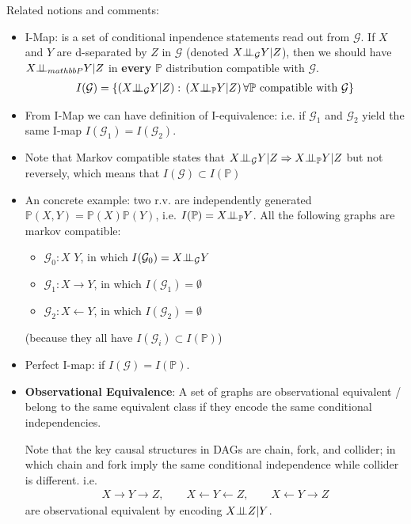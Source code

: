 Related notions and comments:

\begin{itemize}[topsep=2pt,itemsep=0pt]
    \item I-Map: is a set of conditional inpendence statements read out from $ \mathcal{G} $. If $ X $ and $ Y $ are d-separated by $ Z $ in $ \mathcal{G} $ (denoted $ X\bot\!\!\!\bot_\mathcal{G} Y|Z $), then we should have $ X\bot\!\!\!\bot_{mathbb{P}} Y |Z$ in \textbf{every} $ \mathbb{P} $ distribution compatible with $ \mathcal{G} $.
    \begin{align}
         I(\mathcal{G})=\left\{ (X\bot\!\!\!\bot_\mathcal{G}Y|Z):\, (X\bot\!\!\!\bot_\mathbb{P}Y|Z) \,\forall \mathbb{P}\text{ compatible with }\mathcal{G}  \right\}
    \end{align}
    \item From I-Map we can have definition of I-equivalence: i.e. if $ \mathcal{G}_1 $ and $ \mathcal{G}_2 $ yield the same I-map $ I(\mathcal{G}_1)=I(\mathcal{G}_2) $.
    \item Note that Markov compatible states that $ X\bot\!\!\!\bot _\mathcal{G} Y|Z\Rightarrow  X\bot\!\!\!\bot _\mathbb{P} Y|Z $ but not reversely, which means that $ I(\mathcal{G})\subset I(\mathbb{P}) $
    \item An concrete example: two r.v. are independently generated $ \mathbb{P}\left( X,Y \right) =\mathbb{P}\left( X\right)\mathbb{P}\left( Y \right) $, i.e. $ I(\mathbb{P})= X\bot\!\!\!\bot_\mathbb{P} Y $. All the following graphs are markov compatible:
    \begin{itemize}[topsep=2pt,itemsep=0pt]
        \item $ \mathcal{G}_0: X\,\, Y $, in which $ I(\mathcal{G}_0) = X\bot\!\!\!\bot _\mathcal{G} Y $
        \item $ \mathcal{G}_1: X\to Y $, in which $ I(\mathcal{G}_1) = \emptyset  $
        \item $ \mathcal{G}_2: X\leftarrow Y $, in which $  I(\mathcal{G}_2) = \emptyset $
    \end{itemize}
    (because they all have $ I(\mathcal{G}_i)\subset I(\mathbb{P}) $)
    \item Perfect I-map: if $ I(\mathcal{G})=I(\mathbb{P}) $.
    \item \textbf{Observational Equivalence}: A set of graphs are observational equivalent / belong to the same equivalent class if they encode the same conditional independencies. 
    
    Note that the key causal structures in DAGs are chain, fork, and collider; in which chain and fork imply the same conditional independence while collider is different. i.e.
    \begin{align}
        X\to Y\to Z,\qquad X\leftarrow Y\leftarrow Z,\qquad X\leftarrow Y \to Z 
    \end{align}
    are observational equivalent by encoding $ X\bot\!\!\!\bot Z|Y $.
    

\end{itemize}

